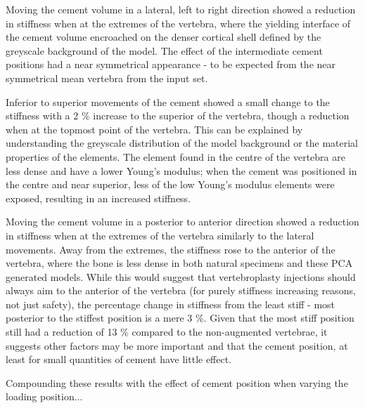 Moving the cement volume in a lateral, left to right direction showed a
reduction in stiffness when at the extremes of the vertebra, where the yielding
interface of the cement volume encroached on the denser cortical shell defined
by the greyscale background of the model.  The effect of the intermediate
cement positions had a near symmetrical appearance - to be expected from the
near symmetrical mean vertebra from the input set.

Inferior to superior movements of the cement showed a small change to the
stiffness with a 2 \% increase to the superior of the vertebra, though a
reduction when at the topmost point of the vertebra.  This can be explained by
understanding the greyscale distribution of the model background or the
material properties of the elements.  The element found in the centre of the
vertebra are less dense and have a lower Young's modulus; when the cement was
positioned in the centre and near superior, less of the low Young's modulus
elements were exposed, resulting in an increased stiffness.

Moving the cement volume in a posterior to anterior direction showed a
reduction in stiffness when at the extremes of the vertebra similarly to the
lateral movements.  Away from the extremes, the stiffness rose to the anterior
of the vertebra, where the bone is less dense in both natural specimens and
these PCA generated models.  While this would suggest that vertebroplasty
injections should always aim to the anterior of the vertebra (for purely
stiffness increasing reasons, not just safety), the percentage change in
stiffness from the least stiff - most posterior to the stiffest position is a
mere 3 \%.  Given that the most stiff position still had a reduction of 13 \%
compared to the non-augmented vertebrae, it suggests other factors may be more
important and that the cement position, at least for small quantities of cement
have little effect.

Compounding these results with the effect of cement position when varying the
loading position... %

